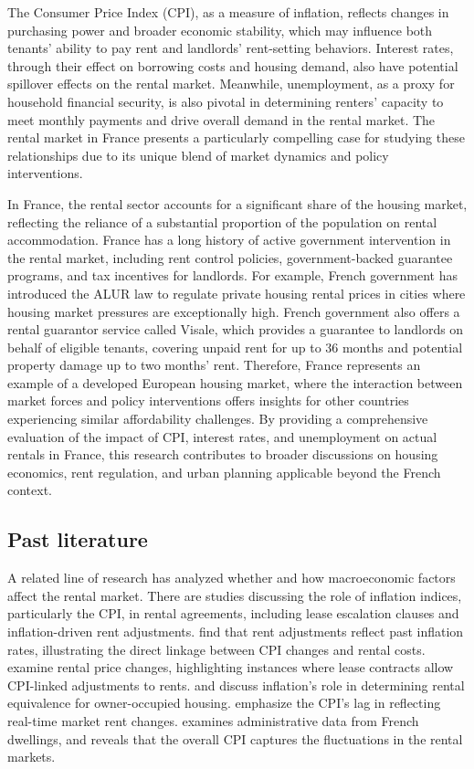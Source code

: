 \documentclass[12pt, times]{article}
\begin{document}
The Consumer Price Index (CPI), as a measure of inflation, reflects changes in purchasing power and broader economic stability, which may influence both tenants' ability to pay rent and landlords' rent-setting behaviors. Interest rates, through their effect on borrowing costs and housing demand, also have potential spillover effects on the rental market. Meanwhile, unemployment, as a proxy for household financial security, is also pivotal in determining renters' capacity to meet monthly payments and drive overall demand in the rental market. The rental market in France presents a particularly compelling case for studying these relationships due to its unique blend of market dynamics and policy interventions.

In France, the rental sector accounts for a significant share of the housing market, reflecting the reliance of a substantial proportion of the population on rental accommodation. France has a long history of active government intervention in the rental market, including rent control policies, government-backed guarantee programs, and tax incentives for landlords. For example, French government has introduced the ALUR law to regulate private housing rental prices in cities where housing market pressures are exceptionally high. French government also offers a rental guarantor service called Visale, which provides a guarantee to landlords on behalf of eligible tenants, covering unpaid rent for up to 36 months and potential property damage up to two months' rent. Therefore, France represents an example of a developed European housing market, where the interaction between market forces and policy interventions offers insights for other countries experiencing similar affordability challenges. By providing a comprehensive evaluation of the impact of CPI, interest rates, and unemployment on actual rentals in France, this research contributes to broader discussions on housing economics, rent regulation, and urban planning applicable beyond the French context.
\vspace{-1.0em}
\subsection{Past literature}
A related line of research has analyzed whether and how macroeconomic factors affect the rental market. There are studies discussing the role of inflation indices, particularly the CPI, in rental agreements, including lease escalation clauses and inflation-driven rent adjustments. \cite{dougherty1982inflation} find that rent adjustments reflect past inflation rates, illustrating the direct linkage between CPI changes and rental costs. \cite{crone2004cpi} examine rental price changes, highlighting instances where lease contracts allow CPI-linked adjustments to rents. \cite{arevalo2004rental} and \cite{eiglsperger2024owner} discuss inflation's role in determining rental equivalence for owner-occupied housing. \cite{ambrose2018housing} emphasize the CPI’s lag in reflecting real-time market rent changes. \cite{levy2021housing} examines administrative data from French dwellings, and reveals that the overall CPI captures the fluctuations in the rental markets. 
\end{document}
